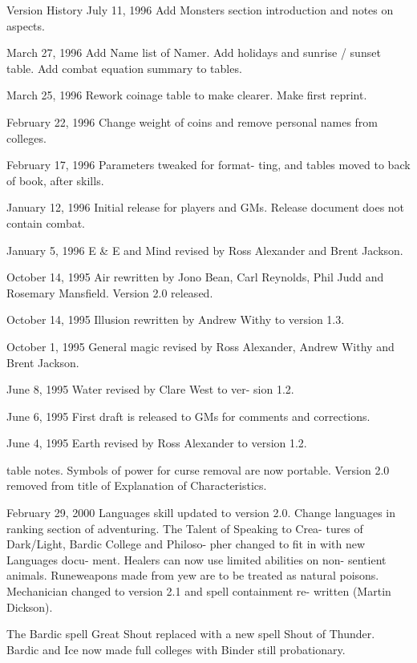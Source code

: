 \begin{Chapter}{Version History}
July  11,  1996  Add  Monsters  section  introduction 
and notes on aspects. 

March  27,  1996  Add  Name  list  of  Namer.  Add 
holidays  and  sunrise  /  sunset  table.  Add  combat 
equation summary to tables. 

March  25,  1996  Rework  coinage  table  to  make 
clearer. Make first reprint. 

February  22,  1996  Change  weight  of  coins  and 
remove personal names from colleges. 

February 17, 1996 Parameters tweaked for format-
ting, and tables moved to back of book, after skills. 

January  12,  1996  Initial  release  for  players  and 
GMs. Release document does not contain combat. 

January 5, 1996 E \& E and Mind revised by Ross 
Alexander and Brent Jackson. 

October 14, 1995 Air rewritten by Jono Bean, Carl 
Reynolds,  Phil  Judd  and  Rosemary  Mansfield. 
Version 2.0 released. 

October  14,  1995  Illusion  rewritten  by  Andrew 
Withy to version 1.3. 

October  1,  1995  General  magic  revised  by  Ross 
Alexander, Andrew Withy and Brent Jackson. 

June  8, 1995 Water  revised  by  Clare West  to  ver-
sion 1.2. 

June  6,  1995  First  draft  is  released  to  GMs  for 
comments and corrections. 

June  4,  1995  Earth  revised  by  Ross  Alexander  to 
version 1.2. 

table  notes.  Symbols  of  power  for  curse  removal 
are  now  portable.  Version  2.0  removed  from  title 
of Explanation of Characteristics. 

February  29,  2000  Languages  skill  updated  to 
version  2.0.  Change  languages  in  ranking  section 
of  adventuring.  The  Talent  of  Speaking  to  Crea-
tures  of  Dark/Light,  Bardic  College  and  Philoso-
pher  changed  to  fit  in  with  new  Languages  docu-
ment. Healers can now use limited abilities on non-
sentient animals. Runeweapons made from yew are 
to  be  treated  as  natural  poisons.  Mechanician 
changed  to  version  2.1  and  spell  containment  re-
written (Martin Dickson). 

The  Bardic  spell  Great  Shout  replaced  with  a new 
spell  Shout  of  Thunder.  Bardic  and  Ice  now  made 
full colleges with Binder still probationary. 


\end{Chapter}
